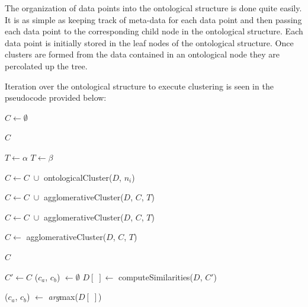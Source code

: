 \documentclass[12pt]{ucthesis}
\begin{document}
      The organization of data points into the ontological structure is done
      quite easily. It is as simple as keeping track of meta-data for each data
      point and then passing each data point to the corresponding child node in
      the ontological structure. Each data point is initially stored in the
      leaf nodes of the ontological structure. Once clusters are formed from
      the data contained in an ontological node they are percolated up the
      tree.

      Iteration over the ontological structure to execute clustering is seen in
      the pseudocode provided below:
      \begin{algorithmic}
            \State $C \gets \emptyset$

               \Return $C$
            \EndIf

               \State $T \gets \alpha$
            \Else
                  \State $T \gets \beta$
               \EndIf
            \EndIf

                  \State $C \gets C\;\cup$ ontologicalCluster($D$, $n_i$)

                     \State $C \gets C\;\cup$ agglomerativeCluster($D$, $C$, $T$)
                  \EndIf
               \EndFor

                  \State $C \gets C\;\cup$ agglomerativeCluster($D$, $C$, $T$)
               \EndIf

            \Else
               \State $C \gets$ agglomerativeCluster($D$, $C$, $T$)
            \EndIf

            \Return $C$
         \EndFunction

            \State $C' \gets C$
            \State ($c_{a}$, $c_{b}$) $\gets \emptyset$
            \State $D[\;] \gets$ computeSimilarities($D$, $C'$)

               \State ($c_a$, $c_b$) $\gets$ \textit{arg}max($D[\;]$)


\end{algorithmic}
\end{document}
